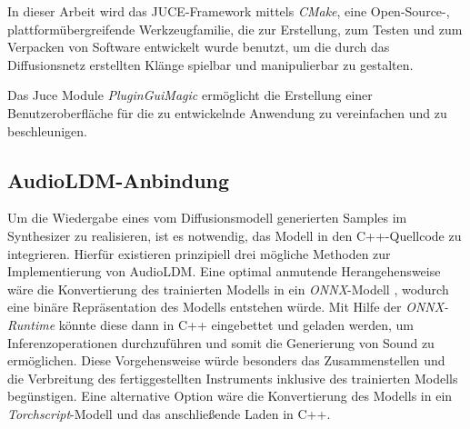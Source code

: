 \documentclass[
  a4paper,  %
  twoside,  %
  bibliography=totoc,
  headsepline,
  cleardoublepage=empty,
  parskip=half,
  draft=false
]{scrbook}
\begin{document}
In dieser Arbeit wird das JUCE-Framework mittels \emph{CMake}, \glqq eine Open-Source-, plattformübergreifende Werkzeugfamilie, die zur Erstellung, zum Testen und zum Verpacken von Software entwickelt wurde\grqq \cite{noauthor_cmake_nodate} benutzt, um die durch das Diffusionsnetz erstellten Klänge spielbar und manipulierbar zu gestalten. 

Das Juce Module \emph{PluginGuiMagic} \cite{walz_plugin_nodate} ermöglicht die Erstellung einer Benutzeroberfläche für die zu entwickelnde Anwendung zu vereinfachen und zu beschleunigen. 


\subsection{AudioLDM-Anbindung} \label{sec:api}
Um die Wiedergabe eines vom Diffusionsmodell generierten Samples im Synthesizer zu realisieren, ist es notwendig, das Modell in den C++-Quellcode zu integrieren. Hierfür existieren prinzipiell drei mögliche Methoden zur Implementierung von AudioLDM. Eine optimal anmutende Herangehensweise wäre die Konvertierung des trainierten Modells in ein \emph{ONNX}-Modell \cite{noauthor_onnx_nodate-1}, wodurch eine binäre Repräsentation des Modells entstehen würde. Mit Hilfe der \emph{ONNX-Runtime} \cite{noauthor_onnx_nodate} könnte diese dann in C++ eingebettet und geladen werden, um Inferenzoperationen durchzuführen und somit die Generierung von Sound zu ermöglichen. Diese Vorgehensweise würde besonders das Zusammenstellen und die Verbreitung des fertiggestellten Instruments inklusive des trainierten Modells begünstigen. Eine alternative Option wäre die Konvertierung des Modells in ein \emph{Torchscript}-Modell \cite{noauthor_torchscript_nodate} und das anschließende Laden in C++. \cite{oli_larkin_machine_2023} 
\end{document}
